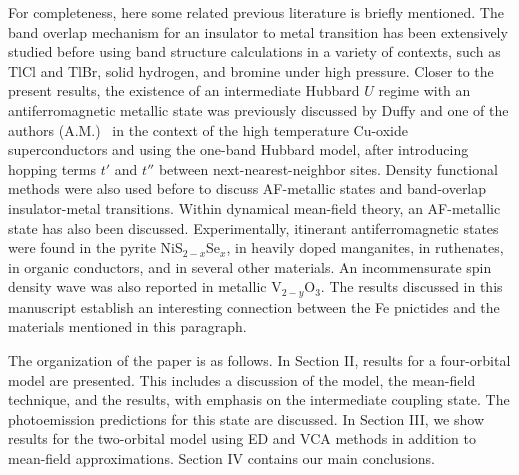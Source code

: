 \documentclass[aps,prb,superscriptaddress,preprintnumbers,
showpacs,legalpaper,twoside,twocolumn,amsmath,amssymb]{revtex4}
\begin{document}
For completeness, here some related previous literature is briefly mentioned.
The band overlap mechanism for an insulator to metal transition has been extensively studied before using band structure
calculations in a variety of contexts,
such as TlCl and TlBr,\cite{samara} solid hydrogen,\cite{hydrogen}
and bromine under high pressure.\cite{bromine}
%
Closer to the present results, the existence
of an intermediate Hubbard $U$ regime with an antiferromagnetic metallic
state was previously discussed by Duffy and one of the authors (A.M.)~\cite{duffy}
in the context of the high temperature Cu-oxide superconductors and using the one-band Hubbard
model, after introducing hopping terms $t'$ and $t''$ between next-nearest-neighbor sites. Density functional methods
were also used before to discuss AF-metallic states and band-overlap insulator-metal transitions.\cite{sander,callaway}
Within dynamical mean-field theory, an AF-metallic state has also been discussed.\cite{marcelo}
Experimentally, itinerant antiferromagnetic states were found in the pyrite NiS$_{2-x}$Se$_x$,\cite{miyasaka,niklowitz}
in heavily doped manganites,\cite{moritomo} in ruthenates,\cite{cao97}
in organic conductors,\cite{organic,organic2} and in several other materials.
An incommensurate spin density wave was also reported in
metallic V$_{2-y}$O$_3$.\cite{bao}
The results discussed in this manuscript establish an interesting connection
between the Fe pnictides and the materials mentioned in this paragraph.

The organization of the paper is as follows. In Section II,
results for a four-orbital model are presented. This
includes a discussion of the model, the mean-field technique, and the
results, with emphasis on the intermediate coupling
state. The photoemission predictions for this state are discussed. In
Section III, we show results for the  two-orbital model using
ED\cite{RMP} and  VCA methods\cite{Aic03,Pot03} in addition
to mean-field approximations.
Section IV contains our main conclusions.
\end{document}

